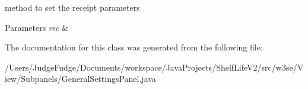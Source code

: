 method to set the receipt parameters 
\begin{DoxyParams}{Parameters}
{\em rec} & \\
\hline
\end{DoxyParams}


The documentation for this class was generated from the following file\-:\begin{DoxyCompactItemize}
\item 
/\-Users/\-Judge\-Fudge/\-Documents/workspace/\-Java\-Projects/\-Shelf\-Life\-V2/src/w3se/\-View/\-Subpanels/General\-Settings\-Panel.\-java\end{DoxyCompactItemize}
